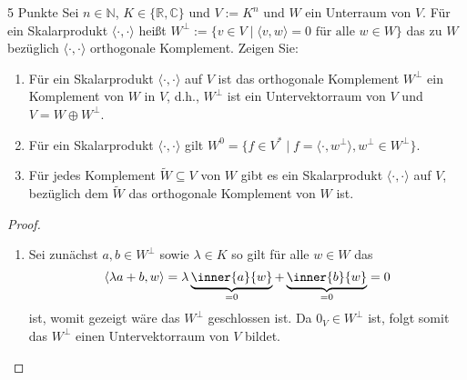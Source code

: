 \documentclass{problemset}
\author{Michael van Straten}
\begin{document}
\maketitle

\begin{problem}{5 Punkte}
Sei $n \in \mathbb{N}$, $K \in \{\mathbb{R}, \mathbb{C}\}$ und $V := K^n$ und
$W$ ein Unterraum von $V$. Für ein Skalarprodukt $\langle \cdot , \cdot
    \rangle$ heißt $W^\perp := \{v \in V \mid \langle v, w \rangle = 0 \text{ für
        alle } w \in W\}$ das zu $W$ bezüglich $\langle \cdot , \cdot \rangle$
orthogonale Komplement. Zeigen Sie:
\begin{enumerate}
    \item Für ein Skalarprodukt $\langle \cdot , \cdot \rangle$ auf $V$ ist das
          orthogonale Komplement $W^\perp$ ein Komplement von $W$ in $V$, d.h.,
          $W^\perp$ ist ein Untervektorraum von $V$ und $V = W \oplus W^\perp$.
    \item Für ein Skalarprodukt $\langle \cdot , \cdot \rangle$ gilt $W^0 = \{f
          \in V^* \mid f = \langle \cdot , w^\perp \rangle, w^\perp \in
          W^\perp\}$.
    \item Für jedes Komplement $\widetilde{W} \subseteq V$ von $W$ gibt es ein
          Skalarprodukt $\langle \cdot , \cdot \rangle$ auf $V$, bezüglich dem
          $\widetilde{W}$ das orthogonale Komplement von $W$ ist.
\end{enumerate}

\begin{proof} \hfill
    \begin{enumerate}
        \item Sei zunächst \(a, b \in W^\perp\) sowie \(\lambda \in K\) so gilt
              für alle \(w \in W\) das
              \begin{equation*}
                  \langle \lambda a + b, w \rangle = \lambda \underbrace{\inner{a}{w}}_{= 0} + \underbrace{\inner{b}{w}}_{=0} = 0
              \end{equation*}
              ist, womit gezeigt wäre das \(W^\perp\) geschlossen ist.
              Da \(0_V \in W^\perp\) ist, folgt somit das \(W^\perp\) einen
              Untervektorraum von \(V\) bildet.


\end{enumerate}
\end{proof}
\end{problem}
\end{document}
